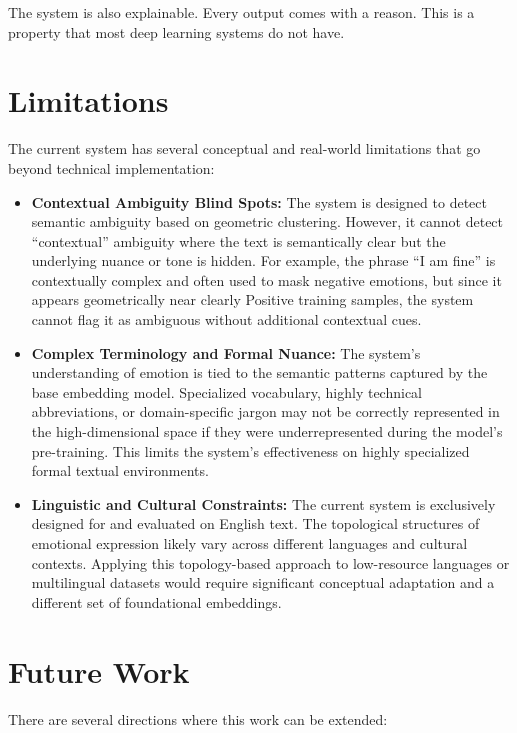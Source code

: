 The system is also explainable. Every output comes with a reason. This is a property that most
deep learning systems do not have.

\section{Limitations}

The current system has several conceptual and real-world limitations that go beyond technical implementation:

\begin{itemize}
    \item \textbf{Contextual Ambiguity Blind Spots:} The system is designed to detect semantic
    ambiguity based on geometric clustering. However, it cannot detect ``contextual'' ambiguity
    where the text is semantically clear but the underlying nuance or tone is hidden. For example, the
    phrase ``I am fine'' is contextually complex and often used to mask negative emotions, but since
    it appears geometrically near clearly Positive training samples, the system cannot flag it as
    ambiguous without additional contextual cues.

    \item \textbf{Complex Terminology and Formal Nuance:} The system's understanding of emotion is tied to
    the semantic patterns captured by the base embedding model. Specialized vocabulary,
    highly technical abbreviations, or domain-specific jargon
    may not be correctly represented in the high-dimensional space if they were underrepresented
    during the model's pre-training. This limits the system's effectiveness on highly specialized
    formal textual environments.

    \item \textbf{Linguistic and Cultural Constraints:} The current system is exclusively
    designed for and evaluated on English text. The topological structures of emotional
    expression likely vary across different languages and cultural contexts. Applying this
    topology-based approach to low-resource languages or multilingual datasets would require
    significant conceptual adaptation and a different set of foundational embeddings.
\end{itemize}

\section{Future Work}

There are several directions where this work can be extended:

